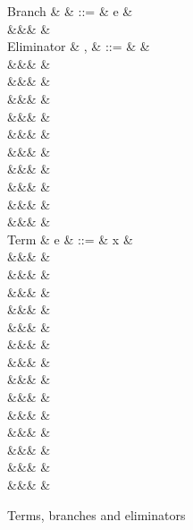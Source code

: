 \begin{figure}
\begin{syntaxfig}
\mbox{Branch}
&
\kappa
&
::=
&
e
&
\\
&&&
\sigma
&
\\[2mm]
\mbox{Eliminator}
&
\sigma, \tau
&
::=
&
&
\\
&&&
&
\\[1mm]
&&&
\elimUnit{\kappa}
&
\\
&&&
\elimUnitProj{\kappa}
&
\\[1mm]
&&&
\elimSum{\sigma}{\tau}
&
\\
&&&
\elimSumProjL{\sigma}{\tau}
&
\\
&&&
\elimSumProjR{\sigma}{\tau}
&
\\[1mm]
&&&
\elimProd{\sigma}
&
\\
&&&
\elimProdProj{\sigma}
&
\\[1mm]
&&&
\elimRoll{\sigma}
&
\\
&&&
\elimRollProj{\sigma}
&
\\[2mm]
\mbox{Term}
&
e
&
::=
&
x
&
\\[1mm]
&&&
\exUnit
&
\\[1mm]
&&&
&
\\
&&&
&
\\[1mm]
&&&
&
\\
&&&
&
\\[1mm]
&&&
&
\\
&&&
&
\\
&&&
&
\\[1mm]
&&&
\exFun{\sigma}
&
\\
&&&
\exFunProj{\elimSingletonProj{\sigma}{\exFun{\tau}}}
&
\\[1mm]
&&&
&
\\
&&&
&
\\[1mm]
&&&
&
\\
&&&
&
\end{syntaxfig}
\caption{Terms, branches and eliminators}
\end{figure}
